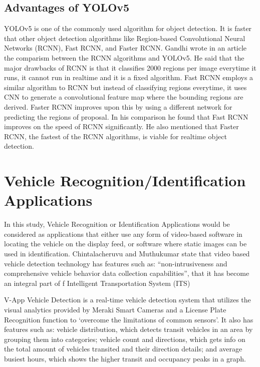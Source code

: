 \subsection{Advantages of YOLOv5}
	YOLOv5 is one of the commonly used algorithm for object detection. It is faster that other object detection algorithms like Region-based Convolutional Neural Networks (RCNN), Fast RCNN, and Faster RCNN. Gandhi \citeyear{gandhi_2018} wrote in an article the comparism between the RCNN algorithms and YOLOv5. He said that the major drawbacks of RCNN is that it classifies 2000 regions per image everytime it runs, it cannot run in realtime and it is a fixed algorithm. Fast RCNN employs a similar algorithm to RCNN but instead of classifying regions everytime, it uses CNN to generate a convolutional feature map where the bounding regions are derived. Faster RCNN improves upon this by using a different network for predicting the regions of proposal. In his comparison he found that Fast RCNN improves on the speed of RCNN significantly. He also mentioned that Faster RCNN, the fastest of the RCNN algorithms, is viable for realtime object detection. 

\section{Vehicle Recognition/Identification Applications}
	
	In this study, Vehicle Recognition or Identification Applications would be considered as applications that either use any form of video-based software in locating the vehicle on the display feed, or software where static images can be used in identification. Chintalacheruvu and Muthukumar \citeyear{chintalacheruvu_2012} state that video based vehicle detection technology has features such as: “non-intrusiveness and comprehensive vehicle behavior data collection capabilities”, that it has become an integral part of f Intelligent Transportation System (ITS)

	V-App Vehicle Detection is a real-time vehicle detection system that utilizes the visual analytics provided by Meraki Smart Cameras and a License Plate Recognition function to ‘overcome the limitations of common sensors’. It also has features such as: vehicle distribution, which detects transit vehicles in an area by grouping them into categories; vehicle count and directions, which gets info on the total amount of vehicles transited and their direction details; and average busiest hours, which shows the higher transit and occupancy peaks in a graph. \cite{VAPP_ND}

